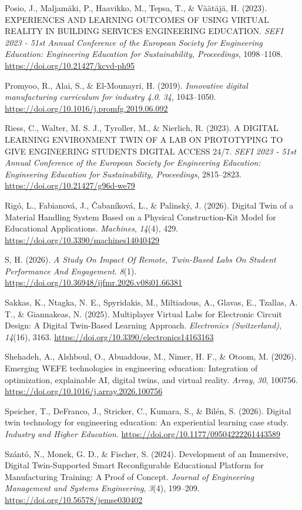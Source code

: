 Posio, J., Maljamäki, P., Haavikko, M., Tepsa, T., \& Väätäjä, H. (2023).
EXPERIENCES AND LEARNING OUTCOMES OF USING VIRTUAL REALITY IN BUILDING
SERVICES ENGINEERING EDUCATION. \emph{SEFI 2023 - 51st Annual Conference of
the European Society for Engineering Education: Engineering Education
for Sustainability, Proceedings}, 1098--1108.
\url{https://doi.org/10.21427/kcvd-ph95}

Promyoo, R., Alai, S., \& El-Mounayri, H. (2019). \emph{Innovative digital
manufacturing curriculum for industry 4.0}. \emph{34}, 1043--1050.
\url{https://doi.org/10.1016/j.promfg.2019.06.092}

Riess, C., Walter, M. S. J., Tyroller, M., \& Nierlich, R. (2023). A
DIGITAL LEARNING ENVIRONMENT TWIN OF A LAB ON PROTOTYPING TO GIVE
ENGINEERING STUDENTS DIGITAL ACCESS 24/7. \emph{SEFI 2023 - 51st Annual
Conference of the European Society for Engineering Education:
Engineering Education for Sustainability, Proceedings}, 2815--2823.
\url{https://doi.org/10.21427/g96d-we79}

Rigó, L., Fabianová, J., Čabaníková, L., \& Palinský, J. (2026). Digital
Twin of a Material Handling System Based on a Physical Construction-Kit
Model for Educational Applications. \emph{Machines}, \emph{14}(4), 429.
\url{https://doi.org/10.3390/machines14040429}

S, H. (2026). \emph{A Study On Impact Of Remote, Twin-Based Labs On Student
Performance And Engagement}. \emph{8}(1).
\url{https://doi.org/10.36948/ijfmr.2026.v08i01.66381}

Sakkas, K., Ntagka, N. E., Spyridakis, M., Miltiadous, A., Glavas, E.,
Tzallas, A. T., \& Giannakeas, N. (2025). Multiplayer Virtual Labs for
Electronic Circuit Design: A Digital Twin-Based Learning Approach.
\emph{Electronics (Switzerland)}, \emph{14}(16), 3163.
\url{https://doi.org/10.3390/electronics14163163}

Shehadeh, A., Alshboul, O., Abuaddous, M., Nimer, H. F., \& Otoom, M.
(2026). Emerging WEFE technologies in engineering education: Integration
of optimization, explainable AI, digital twins, and virtual reality.
\emph{Array}, \emph{30}, 100756. \url{https://doi.org/10.1016/j.array.2026.100756}

Speicher, T., DeFranco, J., Stricker, C., Kumara, S., \& Bilén, S.
(2026). Digital twin technology for engineering education: An
experiential learning case study. \emph{Industry and Higher Education}.
\url{https://doi.org/10.1177/09504222261443589}

Szántó, N., Monek, G. D., \& Fischer, S. (2024). Development of an
Immersive, Digital Twin-Supported Smart Reconfigurable Educational
Platform for Manufacturing Training: A Proof of Concept. \emph{Journal of
Engineering Management and Systems Engineering}, \emph{3}(4), 199--209.
\url{https://doi.org/10.56578/jemse030402}

